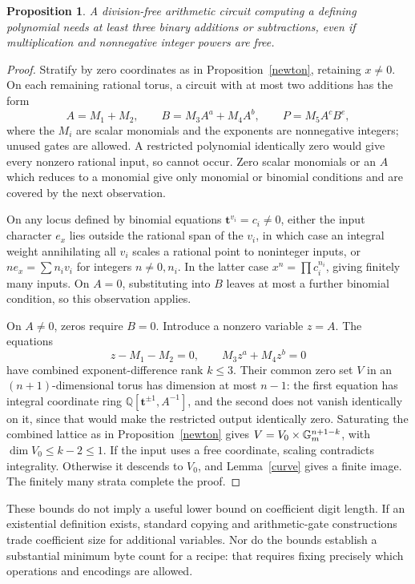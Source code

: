 \documentclass[11pt]{article}
\newtheorem{proposition}[theorem]{Proposition}
\theoremstyle{remark}\newtheorem{remark}[theorem]{Remark}
\newcommand{\Q}{\mathbb Q}\newcommand{\Z}{\mathbb Z}\newcommand{\R}{\mathbb R}
\begin{document}
\begin{proposition}\label{addition}
A division-free arithmetic circuit computing a defining polynomial needs at least three binary additions or subtractions, even if multiplication and nonnegative integer powers are free.
\end{proposition}
\begin{proof}
Stratify by zero coordinates as in Proposition~\ref{newton}, retaining \(x\ne0\). On each remaining rational torus, a circuit with at most two additions has the form
\[
 A=M_1+M_2,\qquad B=M_3A^a+M_4A^b,\qquad P=M_5A^cB^e,
\]
where the \(M_i\) are scalar monomials and the exponents are nonnegative integers; unused gates are allowed. A restricted polynomial identically zero would give every nonzero rational input, so cannot occur. Zero scalar monomials or an \(A\) which reduces to a monomial give only monomial or binomial conditions and are covered by the next observation.

On any locus defined by binomial equations \(\mathbf t^{v_i}=c_i\ne0\), either the input character \(e_x\) lies outside the rational span of the \(v_i\), in which case an integral weight annihilating all \(v_i\) scales a rational point to noninteger inputs, or \(ne_x=\sum n_iv_i\) for integers \(n\ne0,n_i\). In the latter case \(x^n=\prod c_i^{n_i}\), giving finitely many inputs. On \(A=0\), substituting into \(B\) leaves at most a further binomial condition, so this observation applies.

On \(A\ne0\), zeros require \(B=0\). Introduce a nonzero variable \(z=A\). The equations
\[
 z-M_1-M_2=0,\qquad M_3z^a+M_4z^b=0
\]
have combined exponent-difference rank \(k\le3\). Their common zero set \(V\) in an \((n+1)\)-dimensional torus has dimension at most \(n-1\): the first equation has integral coordinate ring \(\Q[\mathbf t^{\pm1},A^{-1}]\), and the second does not vanish identically on it, since that would make the restricted output identically zero. Saturating the combined lattice as in Proposition~\ref{newton} gives
\(V=V_0\times\mathbb G_m^{n+1-k}\), with \(\dim V_0\le k-2\le1\). If the input uses a free coordinate, scaling contradicts integrality. Otherwise it descends to \(V_0\), and Lemma~\ref{curve} gives a finite image. The finitely many strata complete the proof.
\end{proof}

These bounds do not imply a useful lower bound on coefficient digit length. If an existential definition exists, standard copying and arithmetic-gate constructions trade coefficient size for additional variables. Nor do the bounds establish a substantial minimum byte count for a recipe: that requires fixing precisely which operations and encodings are allowed.
\end{document}
